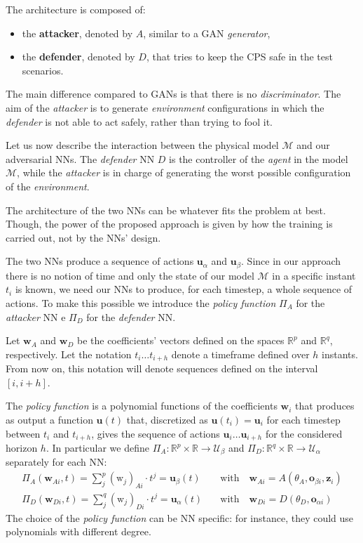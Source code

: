 The architecture is composed of:
\begin{itemize}
  \item the \textbf{attacker}, denoted by $A$, similar to a GAN \textit{generator},
  \item the \textbf{defender}, denoted by $D$, that tries to keep the CPS safe in the test scenarios.
\end{itemize}

The main difference compared to GANs is that there is no \textit{discriminator}.
The aim of the \textit{attacker} is to generate \textit{environment} configurations in which the \textit{defender} is not able to act safely, rather than trying to fool it.

Let us now describe the interaction between the physical model $\mathcal{M}$ and our adversarial NNs.
The \textit{defender} NN $D$ is the controller of the \textit{agent} in the model $\mathcal{M}$, while the \textit{attacker} is in charge of generating the worst possible configuration of the \textit{environment}.

The architecture of the two NNs can be whatever fits the problem at best.
Though, the power of the proposed approach is given by how the training is carried out, not by the NNs' design.

The two NNs produce a sequence of actions $\textbf{u}_\alpha$ and $\textbf{u}_\beta$.
Since in our approach there is no notion of time and only the state of our model $\mathcal{M}$ in a specific instant $t_i$ is known, we need our NNs to produce, for each timestep, a whole sequence of actions.
To make this possible we introduce the \textit{policy function} $\Pi_A$ for the \textit{attacker} NN e $\Pi_D$ for the \textit{defender} NN.

Let $\textbf{w}_A$ and $\textbf{w}_D$ be the coefficients' vectors defined on the spaces $\mathbb{R}^p$ and $\mathbb{R}^q$, respectively.
Let the notation $t_i \dots t_{i+h}$ denote a timeframe defined over $h$ instants.
From now on, this notation will denote sequences defined on the interval $[i, i+h]$.

The \textit{policy function} is a polynomial functions of the coefficients $\textbf{w}_i$ that produces as output a function $\textbf{u}(t)$ that, discretized as $\textbf{u}(t_i) = \textbf{u}_i $ for each timestep between $t_i$ and $t_{i+h}$, gives the sequence of actions $\textbf{u}_i \dots \textbf{u}_{i+h}$ for the considered horizon $h$.
In particular we define $\Pi_A: \mathbb{R}^p \times \mathbb{R} \to \mathcal{U}_\beta$ and $\Pi_D: \mathbb{R}^q \times \mathbb{R} \to \mathcal{U}_\alpha$ separately for each NN:
\begin{align*}
 \Pi_A(\textbf{w}_{Ai}, t)  = 
 \sum_j^p (\mathrm{w}_j)_{Ai} \cdot t^j = \textbf{u}_\beta(t)
& \quad \text{with}\quad
 \textbf{w}_{Ai} = A(\theta_A, \textbf{o}_{\beta i}, \textbf{z}_i) \\
 \Pi_D(\textbf{w}_{Di}, t)  = 
 \sum_j^q (\mathrm{w}_j)_{Di} \cdot t^j = \textbf{u}_\alpha(t)
& \quad \text{with}\quad
 \textbf{w}_{Di} = D(\theta_D, \textbf{o}_{\alpha i})
\end{align*}
The choice of the \textit{policy function} can be NN specific: for instance, they could use polynomials with different degree.

